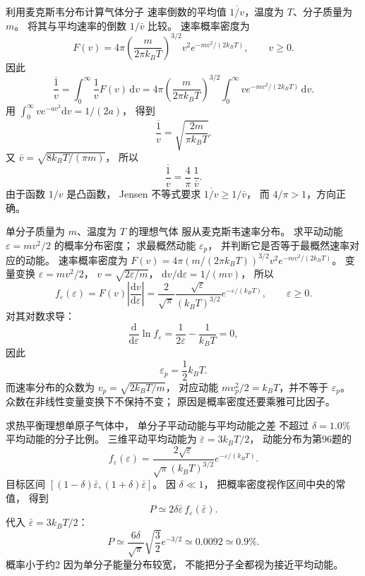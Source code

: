 利用麦克斯韦分布计算气体分子
速率倒数的平均值
$\overline{1/v}$，温度为 $T$、分子质量为 $m$。
将其与平均速率的倒数 $1/\bar v$ 比较。
\exsolution
速率概率密度为
\[
F(v)=4\pi\left(\frac{m}{2\pi k_BT}\right)^{3/2}
v^2e^{-mv^2/(2k_BT)},\qquad v\ge0.
\]
因此
\[
\overline{\frac1v}=\int_0^\infty
\frac1vF(v)\,\mathrm dv
=4\pi\left(\frac m{2\pi k_BT}\right)^{3/2}
\int_0^\infty ve^{-mv^2/(2k_BT)}\,\mathrm dv.
\]
用
$\int_0^\infty ve^{-av^2}\mathrm dv=1/(2a)$，
得到
\[
\boxed{\overline{\frac1v}=
\sqrt{\frac{2m}{\pi k_BT}}}.
\]
又
$\bar v=\sqrt{8k_BT/(\pi m)}$，
所以
\[
\boxed{\overline{\frac1v}
=\frac4\pi\,\frac1{\bar v}}.
\]
\excheck 由于函数 $1/v$ 是凸函数，
Jensen 不等式要求
$\overline{1/v}\ge1/\bar v$，
而 $4/\pi>1$，方向正确。

单分子质量为 $m$、温度为 $T$ 的理想气体
服从麦克斯韦速率分布。
求平动动能 $\varepsilon=mv^2/2$ 的概率分布密度；
求最概然动能 $\varepsilon_p$，
并判断它是否等于最概然速率对应的动能。
\exsolution
速率概率密度为
$F(v)=4\pi(m/(2\pi k_BT))^{3/2}v^2
e^{-mv^2/(2k_BT)}$。
变量变换
$\varepsilon=mv^2/2$，
$v=\sqrt{2\varepsilon/m}$，
$\mathrm dv/\mathrm d\varepsilon=1/(mv)$，
所以
\[
f_\varepsilon(\varepsilon)=
F(v)\left|\frac{\mathrm dv}{\mathrm d\varepsilon}\right|
=\boxed{\frac2{\sqrt\pi}
\frac{\sqrt\varepsilon}{(k_BT)^{3/2}}
e^{-\varepsilon/(k_BT)}},
\qquad\varepsilon\ge0.
\]
对其对数求导：
\[
\frac{\mathrm d}{\mathrm d\varepsilon}\ln f_\varepsilon
=\frac1{2\varepsilon}-\frac1{k_BT}=0,
\]
因此
\[
\boxed{\varepsilon_p=\frac12k_BT}.
\]
而速率分布的众数为
$v_p=\sqrt{2k_BT/m}$，
对应动能
$mv_p^2/2=k_BT$，并不等于 $\varepsilon_p$。
\excheck 众数在非线性变量变换下不保持不变；
原因是概率密度还要乘雅可比因子。

求热平衡理想单原子气体中，
单分子平动动能与平均动能之差
不超过 $\delta=1.0\%$
平均动能的分子比例。
\exsolution
三维平动平均动能为
$\bar\varepsilon=3k_BT/2$，
动能分布为第96题的
\[
f_\varepsilon(\varepsilon)
=\frac{2\sqrt\varepsilon}{\sqrt\pi(k_BT)^{3/2}}
e^{-\varepsilon/(k_BT)}.
\]
目标区间
$[(1-\delta)\bar\varepsilon,
(1+\delta)\bar\varepsilon]$。
因 $\delta\ll1$，
把概率密度视作区间中央的常值，
得到
\[
P\simeq2\delta\bar\varepsilon\,
f_\varepsilon(\bar\varepsilon).
\]
代入
$\bar\varepsilon=3k_BT/2$：
\[
\boxed{P\simeq
\frac{6\delta}{\sqrt\pi}
\sqrt{\frac32}e^{-3/2}
\simeq0.0092\simeq0.9\%}.
\]
\excheck 概率小于约2%
因为单分子能量分布较宽，
不能把分子全都视为接近平均动能。

